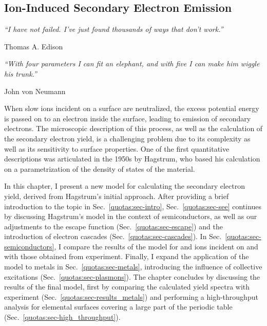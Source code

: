 \begin{refsection} 
 
\chapter{Ion-Induced Secondary Electron Emission} \label{chapter:quotas} 
 
\setlength{\epigraphwidth}{4in} 
\epigraph{\textit{``I have not failed. I've just found thousands of ways that don't 
work.''}}{Thomas A. Edison} 
 
\setlength{\epigraphwidth}{4in} 
\epigraph{\textit{``With four parameters I can fit an elephant, and with five 
I can make him wiggle his trunk.''}}{John von Neumann} 
 
\vspace{2em} 
 
When slow ions incident on a surface are neutralized, the excess potential 
energy is passed on to an electron inside the surface, leading to emission of 
secondary electrons. The microscopic description of this process, as well as 
the calculation of the secondary electron yield, is a challenging problem due 
to its complexity as well as its sensitivity to surface properties. One of the 
first quantitative descriptions was articulated in the 1950s by Hagstrum, who 
based his calculation on a parametrization of the density of states of the 
material.  
 
In this chapter, I present a new model for calculating the secondary electron 
yield, derived from Hagstrum's initial approach. After providing a brief 
introduction to the topic in Sec.~\ref{quotas:sec-intro}, 
Sec.~\ref{quotas:sec-see} continues by discussing Hagstrum's model in the 
context of semiconductors, as well as our adjustments to the escape function 
(Sec.~\ref{quotas:sec-escape}) and the introduction of electron cascades 
(Sec.~\ref{quotas:sec-cascades}). In Sec.~\ref{quotas:sec-semiconductors}, I 
compare the results of the model for  and  ions incident on 
 and  with those obtained from experiment. Finally, I 
expand the application of the model to metals in Sec.~\ref{quotas:sec-metals}, 
introducing the influence of collective excitations 
(Sec.~\ref{quotas:sec-plasmons}). The chapter concludes by discussing the 
results of the final model, first by comparing the calculated yield spectra 
with experiment (Sec.~\ref{quotas:sec-results_metals}) and performing a 
high-throughput analysis for elemental surfaces covering a large part of the 
periodic table (Sec.~\ref{quotas:sec-high_throughput}).


\end{refsection}

